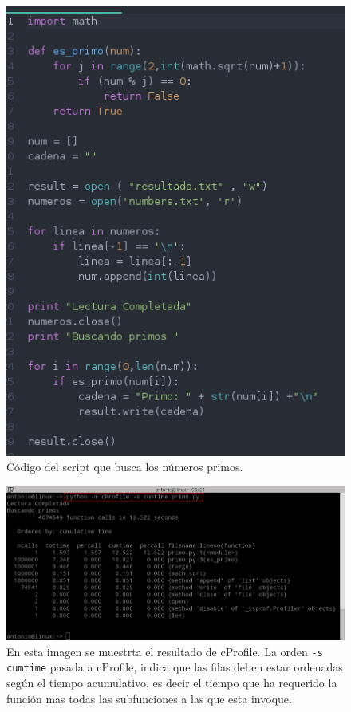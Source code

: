 \begin{figure}[H]
  \begin{center}
    \includegraphics[width=1\textwidth]{imagenes/primo}
    \caption{Código del script que busca los números primos.}
    \label{fig20}
  \end{center}
\end{figure}

\begin{figure}[H]
  \begin{center}
    \includegraphics[width=1\textwidth]{imagenes/cprof}
    \caption{En esta imagen se muestrta el resultado de cProfile. La orden \texttt{-s cumtime} pasada a cProfile, indica que las filas deben estar ordenadas según el tiempo acumulativo, es decir el tiempo que ha requerido la función mas todas las subfunciones a las que esta invoque. }
    \label{fig21}
  \end{center}
\end{figure}

